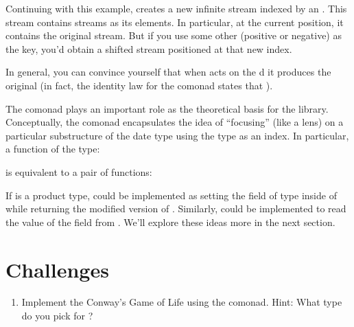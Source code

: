 Continuing with this example,  creates a new infinite
stream indexed by an . This stream contains streams as its
elements. In particular, at the current position, it contains the
original stream. But if you use some other  (positive or
negative) as the key, you'd obtain a shifted stream positioned at that
new index.

In general, you can convince yourself that when  acts on
the d  it produces the original
 (in fact, the identity law for the comonad states that
).

The  comonad plays an important role as the theoretical
basis for the  library. Conceptually, the
 comonad encapsulates the idea of ``focusing'' (like
a lens) on a particular substructure of the date type  using
the type  as an index. In particular, a function of the type:

is equivalent to a pair of functions:

If  is a product type,  could be implemented as
setting the field of type  inside of  while
returning the modified version of . Similarly, 
could be implemented to read the value of the  field from
. We'll explore these ideas more in the next section.

\section{Challenges}

\begin{enumerate}
\tightlist
\item
  Implement the Conway's Game of Life using the  comonad.
  Hint: What type do you pick for ?
\end{enumerate}

